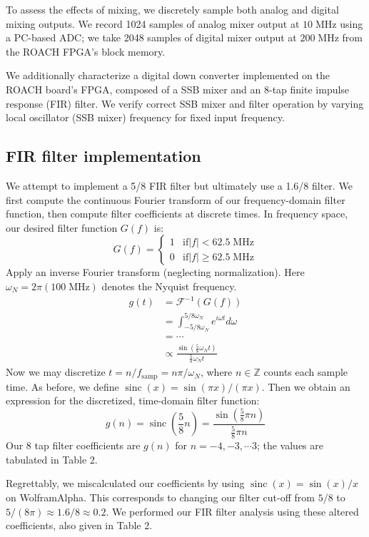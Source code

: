 \documentclass[11pt]{article}
\newcommand {\mt}{\mathrm}
\newcommand {\unit}[1]{\; \mt{#1}}
\newcommand {\ints}{\mathbb{Z}}
\DeclareMathOperator{\sinc}{sinc}
\begin{document}
To assess the effects of mixing, we discretely sample both analog and digital
mixing outputs.  We record 1024 samples of analog mixer output at $10
\unit{MHz}$ using a PC-based ADC; we take 2048 samples of digital mixer output
at $200 \unit{MHz}$ from the ROACH FPGA's block memory.

We additionally characterize a digital down converter implemented on the ROACH
board's FPGA, composed of a SSB mixer and an 8-tap finite impulse
response (FIR) filter.  We verify correct SSB mixer and filter operation by
varying local oscillator (SSB mixer) frequency for fixed input frequency.

\subsection{FIR filter implementation}

We attempt to implement a 5/8 FIR filter but ultimately use a 1.6/8 filter.
We first compute the continuous Fourier transform of our frequency-domain
filter function, then compute filter coefficients at discrete times.  In
frequency space, our desired filter function $G(f)$ is:
\[
    G(f) =
    \begin{cases}
    1   &   \mt{if } |f| < 62.5 \unit{MHz} \\
    0   &   \mt{if } |f| \geq 62.5 \unit{MHz}
    \end{cases}
\]
Apply an inverse Fourier transform (neglecting normalization).
Here $\omega_N = 2\pi (100 \unit{MHz})$ denotes the Nyquist frequency.
\begin{align*}
    g(t) &= \mathcal{F}^{-1}\left( G(f) \right) \\
         &= \int_{-5/8 \omega_N}^{5/8 \omega_N} e^{i\omega t} d\omega \\
         &= \cdots \\
         &\propto \frac{\sin \left( \frac{5}{8} \omega_N t \right)}
            {\frac{5}{8} \omega_N t}
\end{align*}
Now we may discretize $t = n / f_{\mt{samp}} = n \pi / \omega_N$, where
$n\in\ints$ counts each sample time.  As before, we define $\sinc(x) =
\sin(\pi x) / (\pi x)$.  Then we obtain an expression for the discretized,
time-domain filter function:
\[
    g(n) = \sinc \left( \frac{5}{8} n \right)
         = \frac{\sin \left( \frac{5}{8} \pi n \right)}
         {\frac{5}{8} \pi n}
\]
Our 8 tap filter coefficients are $g(n)$ for $n=-4, -3, \cdots 3$; the values
are tabulated in Table 2.

Regrettably, we miscalculated our coefficients by using $\sinc(x) = \sin (x)/x$
on Wolfram\textbar Alpha.  This corresponds to changing our filter cut-off from
$5/8$ to $5/(8\pi) \approx 1.6/8 \approx 0.2$.  We performed our FIR filter
analysis using these altered coefficients, also given in Table 2.
\end{document}
